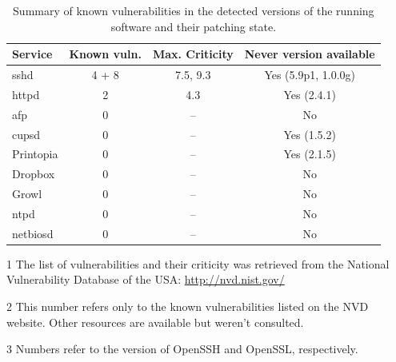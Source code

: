 \documentclass[10pt,a4paper,twoside,onecolumn]{article}
\begin{document}
\begin{table}
\begin{center}
\begin{threeparttable}[b]
\begin{tabularx}{0.75\textwidth}{ X | c | c | c }

\toprule

Service & Known vuln.\tnote{1,2} & Max. Criticity\tnote{1} & Never version available \\

\hline

sshd\tnote{3} & 4 + 8 & 7.5, 9.3 & Yes (5.9p1, 1.0.0g) \\ %
httpd & 2 & 4.3 & Yes (2.4.1)  \\ %
afp & 0 & -- & No \\ %
cupsd & 0 & -- & Yes (1.5.2) \\ %
Printopia & 0 & -- & Yes (2.1.5) \\
Dropbox & 0 & -- & No \\
Growl & 0 & -- & No \\
ntpd & 0 & -- & No \\
netbiosd & 0 & -- & No \\

\bottomrule
\end{tabularx}

\begin{tablenotes}
	\item[1] The list of vulnerabilities and their criticity was retrieved from the National Vulnerability Database of the USA: \url{http://nvd.nist.gov/}
	\item[2] This number refers only to the known vulnerabilities listed on the NVD website. Other resources are available but weren't consulted.
	\item[3] Numbers refer to the version of OpenSSH and OpenSSL, respectively.
\end{tablenotes}


\caption{Summary of known vulnerabilities in the detected versions of the running software and their patching state.}
\label{tab:bugs}
\end{threeparttable}
\end{center}
\end{table}
\end{document}
